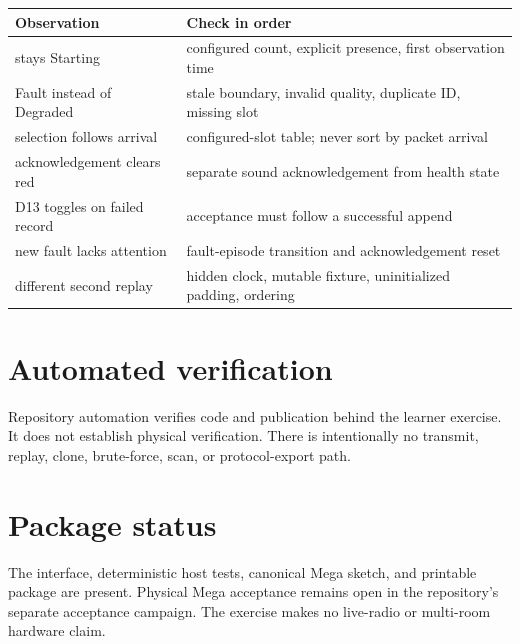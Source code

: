 \documentclass[11pt]{article}
\begin{document}
\begin{tabularx}{\linewidth}{@{}l X@{}}
\toprule
Observation & Check in order\\
\midrule
stays Starting & configured count, explicit presence, first observation time\\
Fault instead of Degraded & stale boundary, invalid quality, duplicate ID, missing slot\\
selection follows arrival & configured-slot table; never sort by packet arrival\\
acknowledgement clears red & separate sound acknowledgement from health state\\
D13 toggles on failed record & acceptance must follow a successful append\\
new fault lacks attention & fault-episode transition and acknowledgement reset\\
different second replay & hidden clock, mutable fixture, uninitialized padding, ordering\\
\bottomrule
\end{tabularx}

\section{Automated verification}

Repository automation verifies code and publication behind the learner
exercise. It does not establish physical verification. There is intentionally
no transmit, replay, clone, brute-force, scan, or protocol-export path.

\section*{Package status}

The interface, deterministic host tests, canonical Mega sketch, and printable
package are present. Physical Mega acceptance remains open in the repository's
separate acceptance campaign. The exercise makes no live-radio or multi-room
hardware claim.
\end{document}
